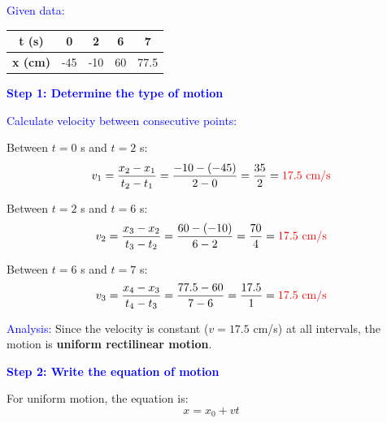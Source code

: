 \begin{exercise}
\begin{solu}
        \vspace{0.3cm}

        \textcolor{blue}{Given data:}
        \begin{center}
            \begin{tabular}{@{}ccccc@{}}
                \toprule
                \textbf{t (s)} & \textbf{0} & \textbf{2} & \textbf{6} & \textbf{7} \\
                \midrule
                \textbf{x (cm)} & -45 & -10 & 60 & 77.5 \\
                \bottomrule
            \end{tabular}
        \end{center}

        \textbf{\textcolor{blue}{Step 1: Determine the type of motion}}

        \textcolor{blue}{Calculate velocity between consecutive points:}

        Between $t = 0$ s and $t = 2$ s:
        \[
            v_1 = \frac{x_2 - x_1}{t_2 - t_1} = \frac{-10 - (-45)}{2 - 0} = \frac{35}{2} = \textcolor{red}{17.5 \text{ cm/s}}
        \]

        Between $t = 2$ s and $t = 6$ s:
        \[
            v_2 = \frac{x_3 - x_2}{t_3 - t_2} = \frac{60 - (-10)}{6 - 2} = \frac{70}{4} = \textcolor{red}{17.5 \text{ cm/s}}
        \]

        Between $t = 6$ s and $t = 7$ s:
        \[
            v_3 = \frac{x_4 - x_3}{t_4 - t_3} = \frac{77.5 - 60}{7 - 6} = \frac{17.5}{1} = \textcolor{red}{17.5 \text{ cm/s}}
        \]

        \textcolor{blue}{Analysis:} Since the velocity is constant ($v = 17.5$ cm/s) at all intervals, the motion is \textbf{uniform rectilinear motion}.

        \vspace{0.3cm}

        \textbf{\textcolor{blue}{Step 2: Write the equation of motion}}

        For uniform motion, the equation is:
        \[
            \boxed{x = x_0 + vt}
        \]


\end{solu}
\end{exercise}
